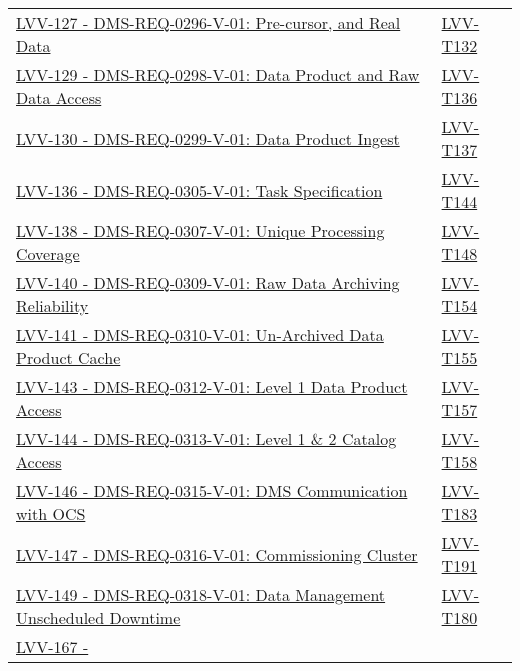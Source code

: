 \begin{longtable}[]{p{13cm}p{3cm}}
\href{https://jira.lsstcorp.org/browse/LVV-127}{LVV-127 -
DMS-REQ-0296-V-01: Pre-cursor, and Real Data} &
\protect\hyperlink{lvv-t132---verify-implementation-of-pre-cursor-and-real-data}{LVV-T132}\tabularnewline
\href{https://jira.lsstcorp.org/browse/LVV-129}{LVV-129 -
DMS-REQ-0298-V-01: Data Product and Raw Data Access} &
\protect\hyperlink{lvv-t136---verify-implementation-of-data-product-and-raw-data-access}{LVV-T136}\tabularnewline
\href{https://jira.lsstcorp.org/browse/LVV-130}{LVV-130 -
DMS-REQ-0299-V-01: Data Product Ingest} &
\protect\hyperlink{lvv-t137---verify-implementation-of-data-product-ingest}{LVV-T137}\tabularnewline
\href{https://jira.lsstcorp.org/browse/LVV-136}{LVV-136 -
DMS-REQ-0305-V-01: Task Specification} &
\protect\hyperlink{lvv-t144---verify-implementation-of-task-specification}{LVV-T144}\tabularnewline
\href{https://jira.lsstcorp.org/browse/LVV-138}{LVV-138 -
DMS-REQ-0307-V-01: Unique Processing Coverage} &
\protect\hyperlink{lvv-t148---verify-implementation-of-unique-processing-coverage}{LVV-T148}\tabularnewline
\href{https://jira.lsstcorp.org/browse/LVV-140}{LVV-140 -
DMS-REQ-0309-V-01: Raw Data Archiving Reliability} &
\protect\hyperlink{lvv-t154---verify-implementation-of-raw-data-archiving-reliability}{LVV-T154}\tabularnewline
\href{https://jira.lsstcorp.org/browse/LVV-141}{LVV-141 -
DMS-REQ-0310-V-01: Un-Archived Data Product Cache} &
\protect\hyperlink{lvv-t155---verify-implementation-of-un-archived-data-product-cache}{LVV-T155}\tabularnewline
\href{https://jira.lsstcorp.org/browse/LVV-143}{LVV-143 -
DMS-REQ-0312-V-01: Level 1 Data Product Access} &
\protect\hyperlink{lvv-t157---verify-implementation-level-1-data-product-access}{LVV-T157}\tabularnewline
\href{https://jira.lsstcorp.org/browse/LVV-144}{LVV-144 -
DMS-REQ-0313-V-01: Level 1 \& 2 Catalog Access} &
\protect\hyperlink{lvv-t158---verify-implementation-level-1-and-2-catalog-access}{LVV-T158}\tabularnewline
\href{https://jira.lsstcorp.org/browse/LVV-146}{LVV-146 -
DMS-REQ-0315-V-01: DMS Communication with OCS} &
\protect\hyperlink{lvv-t183---verify-implementation-of-dms-communication-with-ocs}{LVV-T183}\tabularnewline
\href{https://jira.lsstcorp.org/browse/LVV-147}{LVV-147 -
DMS-REQ-0316-V-01: Commissioning Cluster} &
\protect\hyperlink{lvv-t191---verify-implementation-of-commissioning-cluster}{LVV-T191}\tabularnewline
\href{https://jira.lsstcorp.org/browse/LVV-149}{LVV-149 -
DMS-REQ-0318-V-01: Data Management Unscheduled Downtime} &
\protect\hyperlink{lvv-t180---verify-implementation-of-data-management-unscheduled-downtime}{LVV-T180}\tabularnewline
\href{https://jira.lsstcorp.org/browse/LVV-167}{LVV-167 -
}
\end{longtable}
